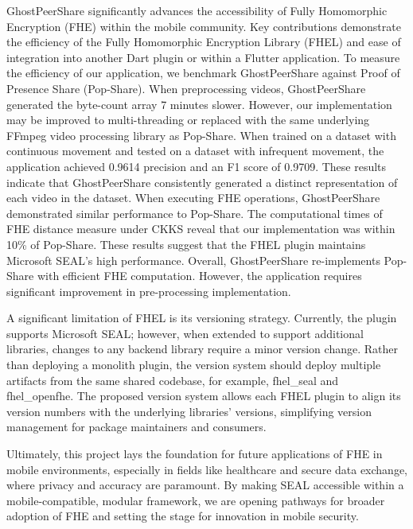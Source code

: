 GhostPeerShare significantly advances the accessibility of Fully Homomorphic Encryption (FHE) within the mobile community. Key contributions demonstrate the efficiency of the Fully Homomorphic Encryption Library (FHEL) and ease of integration into another Dart plugin or within a Flutter application.
To measure the efficiency of our application, we benchmark GhostPeerShare against Proof of Presence Share (Pop-Share).
When preprocessing videos, GhostPeerShare generated the byte-count array 7 minutes slower. However, our implementation may be improved to multi-threading or replaced with the same underlying FFmpeg video processing library as Pop-Share.
When trained on a dataset with continuous movement and tested on a dataset with infrequent movement, the application achieved 0.9614 precision and an F1 score of 0.9709. These results indicate that GhostPeerShare consistently generated a distinct representation of each video in the dataset.
When executing FHE operations, GhostPeerShare demonstrated similar performance to Pop-Share. The computational times of FHE distance measure under CKKS reveal that our implementation was within 10\% of Pop-Share. These results suggest that the FHEL plugin maintains Microsoft SEAL's high performance.
Overall, GhostPeerShare re-implements Pop-Share with efficient FHE computation. However, the application requires significant improvement in pre-processing implementation. 

A significant limitation of FHEL is its versioning strategy. Currently, the plugin supports Microsoft SEAL; however, when extended to support additional libraries, changes to any backend library require a minor version change. Rather than deploying a monolith plugin, the version system should deploy multiple artifacts from the same shared codebase, for example, fhel\_seal and fhel\_openfhe. The proposed version system allows each FHEL plugin to align its version numbers with the underlying libraries' versions, simplifying version management for package maintainers and consumers.

Ultimately, this project lays the foundation for future applications of FHE in mobile environments, especially in fields like healthcare and secure data exchange, where privacy and accuracy are paramount. By making SEAL accessible within a mobile-compatible, modular framework, we are opening pathways for broader adoption of FHE and setting the stage for innovation in mobile security.
